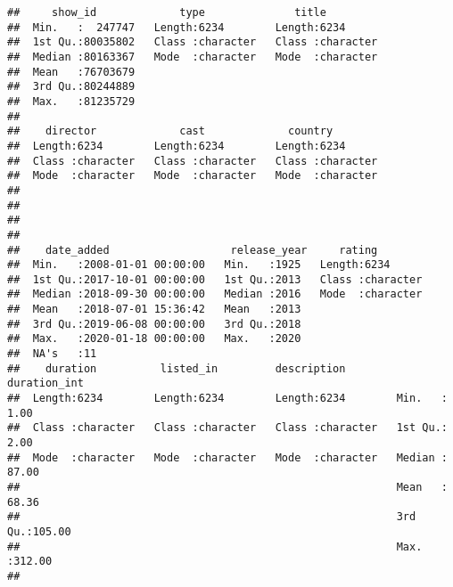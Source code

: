 \documentclass[]{article}
\begin{document}
\begin{verbatim}
##     show_id             type              title          
##  Min.   :  247747   Length:6234        Length:6234       
##  1st Qu.:80035802   Class :character   Class :character  
##  Median :80163367   Mode  :character   Mode  :character  
##  Mean   :76703679                                        
##  3rd Qu.:80244889                                        
##  Max.   :81235729                                        
##                                                          
##    director             cast             country         
##  Length:6234        Length:6234        Length:6234       
##  Class :character   Class :character   Class :character  
##  Mode  :character   Mode  :character   Mode  :character  
##                                                          
##                                                          
##                                                          
##                                                          
##    date_added                   release_year     rating         
##  Min.   :2008-01-01 00:00:00   Min.   :1925   Length:6234       
##  1st Qu.:2017-10-01 00:00:00   1st Qu.:2013   Class :character  
##  Median :2018-09-30 00:00:00   Median :2016   Mode  :character  
##  Mean   :2018-07-01 15:36:42   Mean   :2013                     
##  3rd Qu.:2019-06-08 00:00:00   3rd Qu.:2018                     
##  Max.   :2020-01-18 00:00:00   Max.   :2020                     
##  NA's   :11                                                     
##    duration          listed_in         description         duration_int   
##  Length:6234        Length:6234        Length:6234        Min.   :  1.00  
##  Class :character   Class :character   Class :character   1st Qu.:  2.00  
##  Mode  :character   Mode  :character   Mode  :character   Median : 87.00  
##                                                           Mean   : 68.36  
##                                                           3rd Qu.:105.00  
##                                                           Max.   :312.00  
## 
\end{verbatim}
\end{document}
